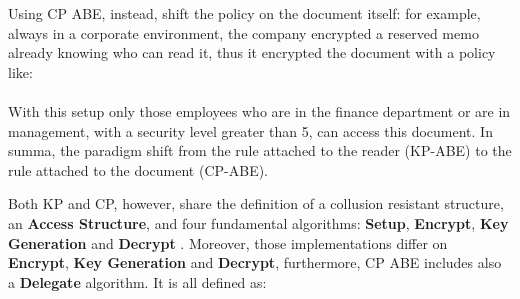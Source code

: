 Using CP ABE, instead, shift the policy on the document itself: for example, always in a corporate environment, the company encrypted a reserved memo already knowing who can read it, thus it encrypted the document with a policy like:\\
\noindent
{}
\noindent\\
With this setup only those employees who are in the finance department or are in management, with a security level greater than 5, can access this document. In summa, the paradigm shift from the rule attached to the reader (KP-ABE) to the rule attached to the document (CP-ABE).

Both KP and CP, however, share the definition of a collusion resistant structure, an \textbf{Access Structure}, and four fundamental algorithms: \textbf{Setup}, \textbf{Encrypt}, \textbf{Key Generation} and \textbf{Decrypt} \cite{goyal2006attribute,bethencourt2007ciphertext}.
Moreover, those implementations differ on \textbf{Encrypt}, \textbf{Key Generation} and \textbf{Decrypt}, furthermore, CP ABE includes also a \textbf{Delegate} algorithm. It is all defined as:
